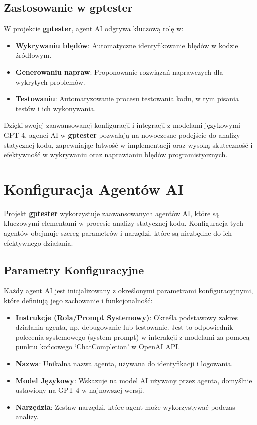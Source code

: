\subsection{Zastosowanie w \textbf{gptester}}

W projekcie \textbf{gptester}, agent AI odgrywa kluczową rolę w:

\begin{itemize}
    \item \textbf{Wykrywaniu błędów}: Automatyczne identyfikowanie błędów w kodzie źródłowym.
    \item \textbf{Generowaniu napraw}: Proponowanie rozwiązań naprawczych dla wykrytych problemów.
    \item \textbf{Testowaniu}: Automatyzowanie procesu testowania kodu, w tym pisania testów i ich wykonywania.
\end{itemize}

Dzięki swojej zaawansowanej konfiguracji i integracji z modelami językowymi GPT-4, agenci AI w \textbf{gptester} pozwalają na nowoczesne podejście do analizy statycznej kodu, zapewniając łatwość w implementacji oraz wysoką skuteczność i efektywność w wykrywaniu oraz naprawianiu błędów programistycznych.

\section{Konfiguracja Agentów AI}
\label{subsec:konfiguracja_agentow}

Projekt \textbf{gptester} wykorzystuje zaawansowanych agentów AI, które są kluczowymi elementami w procesie analizy statycznej kodu. Konfiguracja tych agentów obejmuje szereg parametrów i narzędzi, które są niezbędne do ich efektywnego działania.

\subsection{Parametry Konfiguracyjne}

Każdy agent AI jest inicjalizowany z określonymi parametrami konfiguracyjnymi, które definiują jego zachowanie i funkcjonalność:

\begin{itemize}
    \item \textbf{Instrukcje (Rola/Prompt Systemowy)}: Określa podstawowy zakres działania agenta, np. debugowanie lub testowanie. Jest to odpowiednik polecenia systemowego (system prompt) w interakcji z modelami za pomocą punktu końcowego `ChatCompletion' w OpenAI API.
    \item \textbf{Nazwa}: Unikalna nazwa agenta, używana do identyfikacji i logowania.
    \item \textbf{Model Językowy}: Wskazuje na model AI używany przez agenta, domyślnie ustawiony na GPT-4 w najnowszej wersji.
    \item \textbf{Narzędzia}: Zestaw narzędzi, które agent może wykorzystywać podczas analizy.
\end{itemize}

